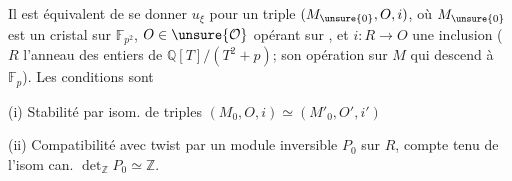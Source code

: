 
Il est équivalent de se donner  $u_\xi$ pour un triple
$(M_{\unsure{0}},O,i)$, où 
$M_{\unsure{0}}$ est un cristal sur $\mathbb F_{p^2}$,
$O\in\unsure{\mathcal O}$ 
opérant sur ,
et $i:R\longrightarrow O$ une inclusion
($R$ l'anneau des entiers de $\mathbb Q[T]/(T^2+p)$;
 son opération sur $M$ qui descend à $\mathbb F_p$).
Les conditions sont

(i) Stabilité par isom. de triples
$(M_0,O,i)\simeq(M'_0,O',i')$

(ii) Compatibilité avec twist par un module inversible $P_0$ sur $R$, compte tenu de l'isom can.
$\det_{\mathbb Z}P_0\simeq\mathbb Z$.
